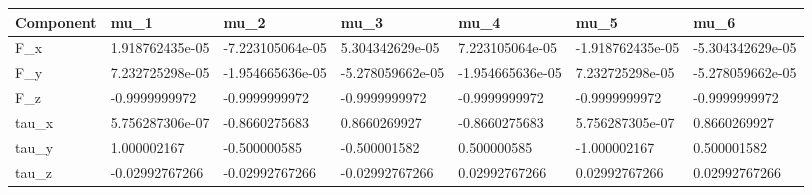 \begin{tabular}{@{}lllllll@{}}
\toprule
Component & mu\_1 & mu\_2 & mu\_3 & mu\_4 & mu\_5 & mu\_6 \\
\midrule
F\_x & 1.918762435e-05 & -7.223105064e-05 & 5.304342629e-05 & 7.223105064e-05 & -1.918762435e-05 & -5.304342629e-05 \\
F\_y & 7.232725298e-05 & -1.954665636e-05 & -5.278059662e-05 & -1.954665636e-05 & 7.232725298e-05 & -5.278059662e-05 \\
F\_z & -0.9999999972 & -0.9999999972 & -0.9999999972 & -0.9999999972 & -0.9999999972 & -0.9999999972 \\
tau\_x & 5.756287306e-07 & -0.8660275683 & 0.8660269927 & -0.8660275683 & 5.756287305e-07 & 0.8660269927 \\
tau\_y & 1.000002167 & -0.500000585 & -0.500001582 & 0.500000585 & -1.000002167 & 0.500001582 \\
tau\_z & -0.02992767266 & -0.02992767266 & -0.02992767266 & 0.02992767266 & 0.02992767266 & 0.02992767266 \\
\bottomrule
\end{tabular}
